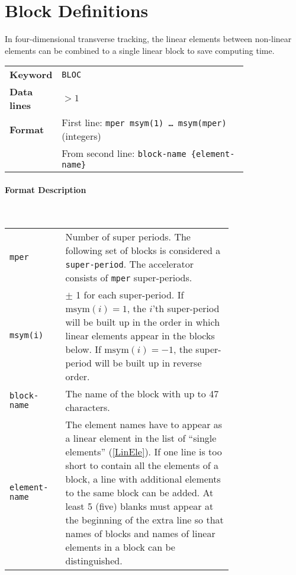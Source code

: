 \section{Block Definitions} \label{BloDef}

In four-dimensional transverse tracking, the linear elements between non-linear elements can be combined to a single linear block to save computing time.

\bigskip
\begin{tabular}{@{}lp{0.8\linewidth}}
    \textbf{Keyword}    & \texttt{BLOC} \\
    \textbf{Data lines} & $>1$ \\
    \textbf{Format}     & First line: \texttt{mper msym(1) \dots~msym(mper)} (integers) \\
                        & From second line: \texttt{block-name \{element-name\}}
\end{tabular}

\paragraph{Format Description}~

\bigskip
\begin{longtabu}{@{}lp{0.75\linewidth}}
    \texttt{mper} & Number of super periods. The following set of blocks is considered a \texttt{super-period}. The accelerator consists of \texttt{mper} super-periods. \\
    \texttt{msym(i)} & $\pm$ 1 for each super-period. If $\mathrm{msym}(i)=1$, the \mbox{$i$'th} super-period will be built up in the order in which linear elements appear in the blocks  below. If $\mathrm{msym}(i)=-1$, the super-period will be built up in reverse order. \\
    \texttt{block-name} & The name of the block with up to 47 characters. \\
    \texttt{element-name} & The element names have to appear as a linear element in the list of ``single elements'' (\ref{LinEle}). If one line is too short to contain all the elements of a block, a line with additional elements to the same block can be added. At least 5 (five) blanks must appear at the beginning of the extra line so that names of blocks and names of linear elements in a block can be distinguished.
\end{longtabu}

